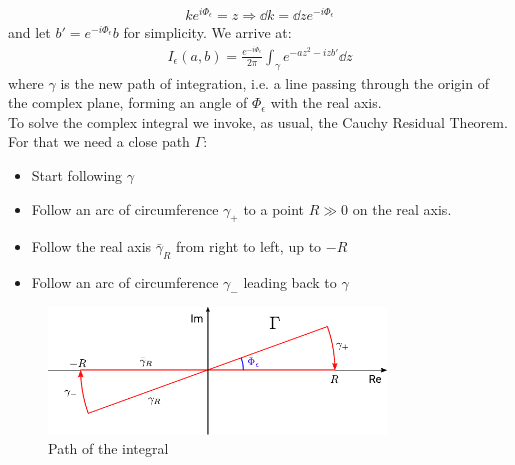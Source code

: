 \documentclass[../template.tex]{subfiles}
\begin{document}
\begin{example}
\begin{enumerate}
\begin{align*}
            k e^{i \Phi_\epsilon} = z \Rightarrow \dd{k} = \dd{z} e^{-i \Phi_\epsilon} 
        \end{align*} 
        and let $b' = e^{-i \Phi_\epsilon} b$ for simplicity. We arrive at:
        \begin{align*}
            I_\epsilon(a,b) = \frac{e^{-i \Phi_\epsilon}}{2 \pi} \int_\gamma e^{-a z^2 - izb'} \dd{z} 
        \end{align*}
        where $\gamma$ is the new path of integration, i.e. a line passing through the origin of the complex plane, forming an angle of $\Phi_\epsilon$ with the real axis.\\
        To solve the complex integral we invoke, as usual, the Cauchy Residual Theorem. For that we need a close path $\Gamma$:
        \begin{itemize}
            \item Start following $\gamma$ 
            \item Follow an arc of circumference $\gamma_+$  to a point $R \gg 0$ on the real axis.
            \item Follow the real axis $\bar{\gamma}_R$  from right to left, up to $-R$
            \item Follow an arc of circumference $\gamma_-$  leading back to $\gamma$    
        \end{itemize}
        \begin{figure}[H]
            \centering
            \includegraphics[width=0.8\textwidth]{Images/path.pdf}
            \caption{Path of the integral\label{fig:path}}
        \end{figure}
        

\end{enumerate}
\end{example}
\end{document}
